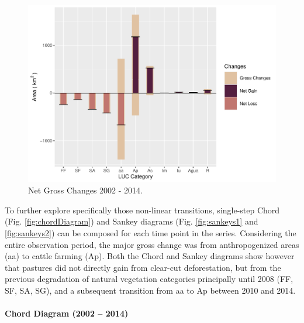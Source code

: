 \begin{Schunk}
\begin{figure}[h]

{\centering \includegraphics[width=0.7\linewidth, height=0.45\linewidth]{figures/net_gross.pdf} 

}

\caption[Net Gross Changes 2002 - 2014]{Net Gross Changes 2002 - 2014.}\label{fig:ng_plot}
\end{figure}
\end{Schunk}

To further explore specifically those non-linear transitions,
single-step Chord (Fig. \ref{fig:chordDiagram}) and Sankey diagrams
(Fig. \ref{fig:sankeys1} and \ref{fig:sankeys2}) can be composed for
each time point in the series. Considering the entire observation
period, the major gross change was from anthropogenized areas (aa) to
cattle farming (Ap). Both the Chord and Sankey diagrams show however
that pastures did not directly gain from clear-cut deforestation, but
from the previous degradation of natural vegetation categories
principally until 2008 (FF, SF, SA, SG), and a subsequent transition
from aa to Ap between 2010 and 2014.

\hypertarget{chord-diagram-2002-2014}{%
\paragraph{Chord Diagram (2002 -- 2014)}\label{chord-diagram-2002-2014}}

